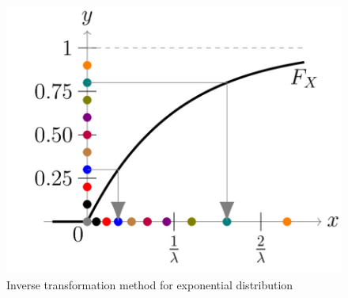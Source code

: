 \vspace{3mm}
\begin{figure}[H]
    \centering
    \includegraphics[width=0.7\linewidth]{images/countermeasures/inverse_transformation_method_for_exponential_distribution.jpg}
    \caption{Inverse transformation method for exponential distribution}
    \label{fig:distribution}
\end{figure}
\vspace{3mm}